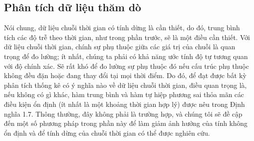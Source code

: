 \documentclass[12pt, a4paper,oneside]{book}
\theoremstyle{definition}
\begin{document}
\subsection{Phân tích dữ liệu thăm dò}
Nói chung, dữ liệu chuỗi thời gian có tính dừng là cần thiết, do đó, trung bình tích các độ trễ theo thời gian, như trong phần trước, sẽ là một điều cần thiết. Với dữ liệu chuỗi thời gian, chính sự phụ thuộc giữa các giá trị của chuỗi là quan trọng để đo lường; ít nhất, chúng ta phải có khả năng ước tính độ tự tương quan với độ chính xác. Sẽ rất khó để đo lường sự phụ thuộc đó nếu cấu trúc phụ thuộc không đều đặn hoặc đang thay đổi tại mọi thời điểm.
Do đó, để đạt được bất kỳ phân tích thống kê có ý nghĩa nào về dữ liệu chuỗi thời gian, điều quan trọng là, nếu không có gì khác, hàm trung bình và hàm tự hiệp phương sai thỏa mãn các điều kiện ổn định (ít nhất là một khoảng thời gian hợp lý) được nêu trong Định nghĩa 1.7. Thông thường, đây không phải là trường hợp, và chúng tôi sẽ đề cập đến một số phương pháp trong phần này để làm giảm ảnh hưởng của tính không ổn định và để tính dừng của chuỗi thời gian có thể được nghiên cứu. 
\end{document}
